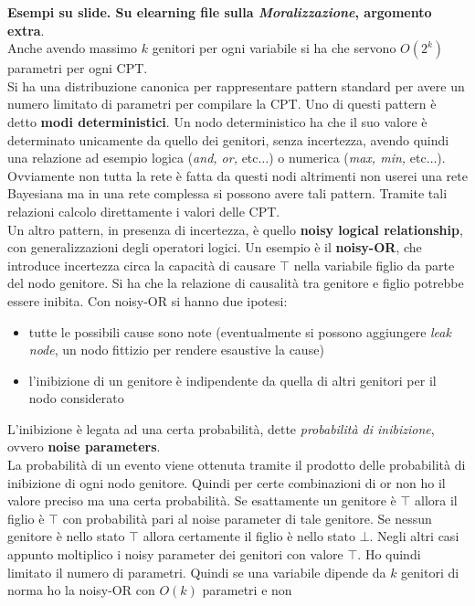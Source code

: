 \documentclass[a4paper,12pt, oneside]{book}
\begin{document}
\textbf{Esempi su slide. Su elearning file sulla \textit{Moralizzazione},
  argomento extra}.\\
Anche avendo massimo $k$ genitori per ogni variabile si ha che servono $O(2^k)$
parametri per ogni CPT.\\
Si ha una distribuzione canonica per rappresentare pattern standard per avere un
numero limitato di parametri per compilare la CPT. Uno di questi pattern è detto
\textbf{modi deterministici}. Un nodo deterministico ha che il suo valore è
determinato unicamente da quello dei genitori, senza incertezza, avendo quindi
una relazione ad esempio logica (\textit{and, or,} etc$\ldots$) o numerica
(\textit{max, min, }etc$\ldots$). Ovviamente non tutta la rete è fatta da questi
nodi altrimenti non userei una rete Bayesiana ma in una rete complessa si
possono avere tali pattern. Tramite tali relazioni calcolo direttamente i valori
delle CPT.\\
Un altro pattern, in presenza di incertezza, è quello \textbf{noisy logical
  relationship}, con generalizzazioni degli operatori logici. Un esempio è il
\textbf{noisy-OR}, che introduce incertezza circa la capacità di causare $\top$
nella variabile figlio da parte del nodo genitore. Si ha che la relazione di
causalità tra genitore e figlio potrebbe essere inibita. Con noisy-OR si hanno due
ipotesi:
\begin{itemize}
  \item tutte le possibili cause sono note (eventualmente si possono aggiungere
  \textit{leak node}, un nodo fittizio per rendere esaustive la cause)
  \item l'inibizione di un genitore è indipendente da quella di altri genitori
  per il nodo considerato
\end{itemize}
L'inibizione è legata ad una certa probabilità, dette \textit{probabilità di
  inibizione}, ovvero \textbf{noise parameters}.\\
La probabilità di un evento viene ottenuta tramite il prodotto delle probabilità
di inibizione di ogni nodo genitore. Quindi per certe combinazioni di or non ho
il valore preciso ma una certa probabilità. Se esattamente un genitore è $\top$
allora il figlio è $\top$ con probabilità pari al noise parameter di tale
genitore. Se nessun genitore è nello stato $\top$ allora certamente il figlio è
nello stato $\bot$. Negli
altri casi appunto moltiplico i noisy parameter dei genitori con valore
$\top$. Ho quindi limitato il numero di parametri. Quindi se una variabile
dipende da $k$ genitori di norma ho la noisy-OR con $O(k)$ parametri e non
\end{document}
